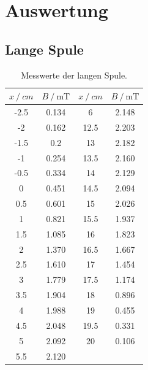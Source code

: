 \section{Auswertung}
\label{sec:Auswertung}

\subsection{Lange Spule}

\FloatBarrier

\begin{table}
\centering
\caption{Messwerte der langen Spule.}
\begin{tabular}{cc|cc}
  \toprule
  $x \:/\: \si{cm}$ & $B \:/\: \si{\milli\tesla}$ & $x \:/\: \si{cm}$ & $B \:/\: \si{\milli\tesla}$ \\
  \midrule
  -2.5 & 0.134 &  6 & 2.148  \\
  -2 & 0.162 & 12.5 & 2.203 \\
  -1.5 & 0.2 &  13 & 2.182 \\
  -1 & 0.254 & 13.5 & 2.160 \\
  -0.5 & 0.334 &  14 & 2.129 \\ 
  0 & 0.451  & 14.5 & 2.094 \\
  0.5 & 0.601 & 15 & 2.026 \\
  1 & 0.821  & 15.5 & 1.937 \\
  1.5 & 1.085  & 16 & 1.823 \\
  2 & 1.370  & 16.5 & 1.667 \\
  2.5 & 1.610  &  17 & 1.454 \\
  3 & 1.779  & 17.5 & 1.174 \\
  3.5 & 1.904  & 18 & 0.896 \\
  4 & 1.988 & 19 & 0.455 \\
  4.5 & 2.048  &  19.5 & 0.331 \\
  5 & 2.092  & 20 & 0.106 \\
  5.5 & 2.120 & & \\
  \bottomrule
\end{tabular}
\label{tab:long}
\end{table}

